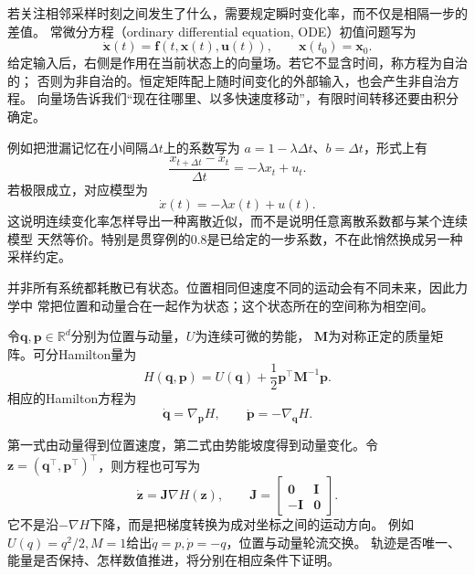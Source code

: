 若关注相邻采样时刻之间发生了什么，需要规定瞬时变化率，而不仅是相隔一步的差值。
常微分方程（ordinary differential equation, ODE）初值问题写为
\begin{equation}
  \dot{\bm x}(t)=\bm f(t,\bm x(t),\bm u(t)),\qquad
  \bm x(t_0)=\bm x_0.
  \label{eq:dynamical-general-ivp}
\end{equation}
给定输入后，右侧是作用在当前状态上的向量场。若它不显含时间，称方程为自治的；
否则为非自治的。恒定矩阵配上随时间变化的外部输入，也会产生非自治方程。
向量场告诉我们“现在往哪里、以多快速度移动”，有限时间转移还要由积分确定。

例如把泄漏记忆在小间隔$\Delta t$上的系数写为
$a=1-\lambda\Delta t$、$b=\Delta t$，形式上有
\[
  \frac{x_{t+\Delta t}-x_t}{\Delta t}=-\lambda x_t+u_t.
\]
若极限成立，对应模型为
\begin{equation}
  \dot x(t)=-\lambda x(t)+u(t).
  \label{eq:dynamical-leaky-continuous-memory}
\end{equation}
这说明连续变化率怎样导出一种离散近似，而不是说明任意离散系数都与某个连续模型
天然等价。特别是贯穿例的$0.8$是已给定的一步系数，不在此悄然换成另一种采样约定。

并非所有系统都耗散已有状态。位置相同但速度不同的运动会有不同未来，因此力学中
常把位置和动量合在一起作为状态；这个状态所在的空间称为相空间。
\begin{definition}[可分Hamilton系统]
  \label{def:dynamical-separable-hamiltonian-system}
  令$\bm q,\bm p\in\mathbb R^d$分别为位置与动量，$U$为连续可微的势能，
  $\bm M$为对称正定的质量矩阵。可分Hamilton量为
  \begin{equation}
    H(\bm q,\bm p)=U(\bm q)+\frac12\bm p^\top\bm M^{-1}\bm p.
    \label{eq:dynamical-separable-hamiltonian}
  \end{equation}
  相应的Hamilton方程为
  \begin{equation}
    \dot{\bm q}=\nabla_{\bm p}H,\qquad
    \dot{\bm p}=-\nabla_{\bm q}H.
    \label{eq:dynamical-hamilton-equations}
  \end{equation}
\end{definition}
第一式由动量得到位置速度，第二式由势能坡度得到动量变化。令
$\bm z=(\bm q^\top,\bm p^\top)^\top$，则方程也可写为
\[
  \dot{\bm z}=\bm J\nabla H(\bm z),\qquad
  \bm J=\begin{bmatrix}\bm0&\bm I\\-\bm I&\bm0\end{bmatrix}.
\]
它不是沿$-\nabla H$下降，而是把梯度转换为成对坐标之间的运动方向。
例如$U(q)=q^2/2,M=1$给出$\dot q=p,\dot p=-q$，位置与动量轮流交换。
轨迹是否唯一、能量是否保持、怎样数值推进，将分别在相应条件下证明。

